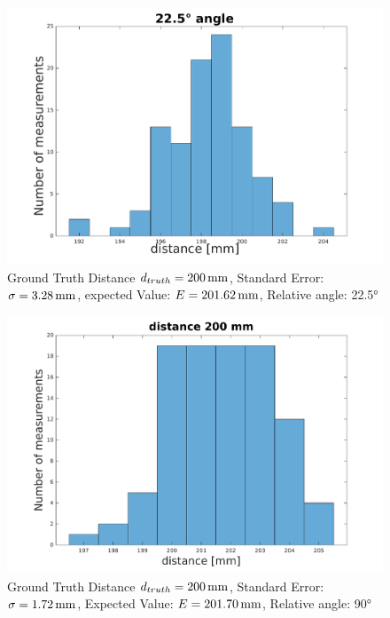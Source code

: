 \begin{figure}
	\centering
	\includegraphics[width=0.9\linewidth]{pictures/plot_angles_22.pdf}
	\caption{Ground Truth Distance $d_{truth}= \unit[200]{mm}$, Standard Error: $\sigma=\unit[3.28]{mm}$, expected Value: $E=\unit[201.62]{mm}$, Relative angle: 22.5°}
	\label{fig:angle22.5}
\end{figure}

\begin{figure}
	\centering
	\includegraphics[width=0.9\linewidth]{pictures/plot_dist200.pdf}
	\caption{Ground Truth Distance $d_{truth}= \unit[200]{mm}$, Standard Error: $\sigma=\unit[1.72]{mm}$, Expected Value: $E=\unit[201.70]{mm}$, Relative angle: 90°}
	\label{fig:dist200}
\end{figure}

